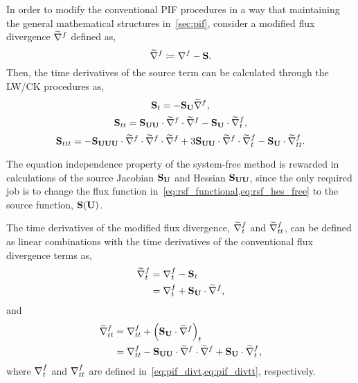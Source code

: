In order to modify the conventional PIF procedures
in a way that maintaining the general mathematical structures
in~\cref{sec:pif}, consider a modified flux divergence \( \widetilde{\nabla}^{f} \) defined as,
\begin{equation}\label{eq:sf_source_divs}
    \widetilde{\nabla}^{f} \coloneqq \nabla^{f} - \mathbf{S}.
\end{equation}
Then, the time derivatives of the source term can be calculated through
the LW/CK procedures as,
\begin{equation}\label{eq:sf_source_St}
    \mathbf{S}_{t} = -\mathbf{S}_{\mathbf{U}} \widetilde{\nabla}^{f},
\end{equation}
\begin{equation}\label{eq:sf_source_Stt}
    \mathbf{S}_{tt} = \mathbf{S}_{\mathbf{U} \mathbf{U}} \cdot \widetilde{\nabla}^{f} \cdot \widetilde{\nabla}^{f} - \mathbf{S}_{\mathbf{U}} \cdot \widetilde{\nabla}^{f}_{t},
\end{equation}
\begin{equation}\label{eq:sf_source_Sttt}
    \mathbf{S}_{ttt} = -\mathbf{S}_{\mathbf{U} \mathbf{U} \mathbf{U}} \cdot \widetilde{\nabla}^{f} \cdot \widetilde{\nabla}^{f} \cdot \widetilde{\nabla}^{f}
    + 3 \mathbf{S}_{\mathbf{U} \mathbf{U}} \cdot \widetilde{\nabla}^{f} \cdot \widetilde{\nabla}^{f}_{t}
    - \mathbf{S}_{\mathbf{U}} \cdot \widetilde{\nabla}^{f}_{tt}.
\end{equation}

The equation independence property of the system-free method
is rewarded in calculations of the source Jacobian \( \mathbf{S}_{\mathbf{U}} \) and Hessian \( \mathbf{S}_{\mathbf{U}\mathbf{U}} \),
since the only required job is to change the flux function
in~\cref{eq:rsf_functional,eq:rsf_hes_free} to the source function, \( \mathbf{S}(\mathbf{U}) \).

The time derivatives of the modified flux divergence, \( \widetilde{\nabla}^{f}_{t} \) and \( \widetilde{\nabla}^{f}_{tt} \),
can be defined as linear combinations with the time derivatives of the conventional
flux divergence terms as,
\begin{equation}\label{eq:sf_source_divst}
    \begin{split}
        \widetilde{\nabla}^{f}_{t} &= \nabla^{f}_{t} - \mathbf{S}_{t} \\
                  &= \nabla^{f}_{t} + \mathbf{S}_{\mathbf{U}} \cdot \widetilde{\nabla}^{f},
    \end{split}
\end{equation}
and
\begin{equation}\label{eq:sf_source_divstt}
    \begin{split}
        \widetilde{\nabla}^{f}_{tt} &= \nabla^{f}_{tt} + \left( \mathbf{S}_{\mathbf{U}} \cdot \widetilde{\nabla}^{f} \right)_{t} \\
                   &= \nabla^{f}_{tt} - \mathbf{S}_{\mathbf{U}\mathbf{U}} \cdot \widetilde{\nabla}^{f} \cdot \widetilde{\nabla}^{f} + \mathbf{S}_{\mathbf{U}} \cdot \widetilde{\nabla}^{f}_{t},
    \end{split}
\end{equation}
where \( \nabla^{f}_{t} \) and \( \nabla^{f}_{tt} \) are defined in~\cref{eq:pif_divt,eq:pif_divtt}, respectively.


